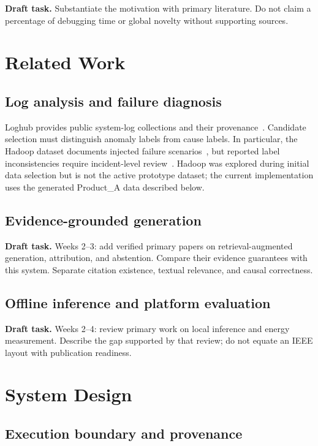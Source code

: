 \documentclass[conference]{IEEEtran}
\newcommand{\draftnote}[1]{%
\par\smallskip\noindent
\colorbox{pale}{%
\parbox{\dimexpr\columnwidth-2\fboxsep\relax}{%
\small\textbf{Draft task.} #1}}%
\par\smallskip}
\begin{document}
\draftnote{
Substantiate the motivation with primary literature.
Do not claim a percentage of debugging time or global novelty
without supporting sources.
}

\section{Related Work}

\subsection{Log analysis and failure diagnosis}

Loghub provides public system-log collections and their
provenance~\cite{loghub}. Candidate selection must distinguish
anomaly labels from cause labels. In particular, the Hadoop
dataset documents injected failure scenarios~\cite{hadoop},
but reported label inconsistencies require incident-level
review~\cite{hadooplabels}. Hadoop was explored during initial
data selection but is not the active prototype dataset;
the current implementation uses the generated Product\_A
data described below.

\subsection{Evidence-grounded generation}

\draftnote{
Weeks 2--3: add verified primary papers on retrieval-augmented
generation, attribution, and abstention. Compare their evidence
guarantees with this system. Separate citation existence,
textual relevance, and causal correctness.
}

\subsection{Offline inference and platform evaluation}

\draftnote{
Weeks 2--4: review primary work on local inference and energy
measurement. Describe the gap supported by that review;
do not equate an IEEE layout with publication readiness.
}

\section{System Design}

\subsection{Execution boundary and provenance}
\end{document}
